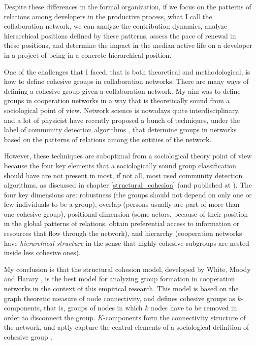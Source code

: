 Despite these differences in the formal organization, if we focus on the patterns of relations among developers in the productive process, what I call the collaboration network, we can analyze the contribution dynamics, analyze hierarchical positions defined by these patterns, assess the pace of renewal in these positions, and determine the impact in the median active life on a developer in a project of being in a concrete hierarchical position.

One of the challenges that I faced, that is both theoretical and methodological, is how to define cohesive groups in collaboration networks. There are many ways of defining a cohesive group given a collaboration network. My aim was to define groups in cooperation networks in a way that is theoretically sound from a sociological point of view. Network science is nowadays quite interdisciplinary, and a lot of physicist have recently proposed a bunch of techniques, under the label of community detection algorithms \citep{fortunato:2010}, that determine groups in networks based on the patterns of relations among the entities of the network.

However, these techniques are suboptimal from a sociological theory point of view because the four key elements that a sociologically sound group classification should have are not present in most, if not all, most used community detection algorithms, as discussed in chapter \ref{structural_cohesion} (and published at \citep{torrents:2015}). The four key dimensions are: robustness (the groups should not depend on only one or few individuals to be a group), overlap (persons usually are part of more than one cohesive group), positional dimension (some actors, because of their position in the global patterns of relations, obtain preferential access to information or resources that flow through the network), and hierarchy (cooperation networks have \emph{hierarchical structure} in the sense that highly cohesive subgroups are nested inside less cohesive ones).

My conclusion is that the structural cohesion model, developed by White, Moody and Harary \citep{white:2001, moody:2003}, is the best model for analyzing group formation in cooperation networks in the context of this empirical research. This model is based on the graph theoretic measure of node connectivity, and defines cohesive groups as $k$-components, that is, groups of nodes in which $k$ nodes have to be removed in order to disconnect the group. $K$-components form the connectivity structure of the network, and aptly capture the central elements of a sociological definition of cohesive group \citep{torrents:2015}.


